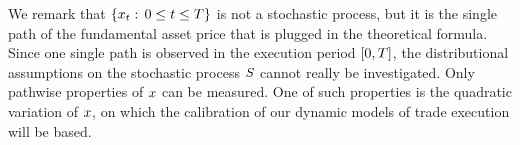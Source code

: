 \documentclass[10pt,a4paper]{article}
\begin{document}
We remark that $\lbrace x_t : \, 0\leq t\leq T\rbrace$ is not a stochastic process, but it is the single path of the fundamental asset price that is plugged in the theoretical formula. Since one single path is observed in the execution period ${[0,T]}$, the distributional assumptions on the stochastic process $S$ cannot really be investigated. Only pathwise properties of $x$ can be measured. One of such properties is the quadratic variation of $x$, on which the calibration of our dynamic models of trade execution will be based. 
%	
%	
\end{document}

